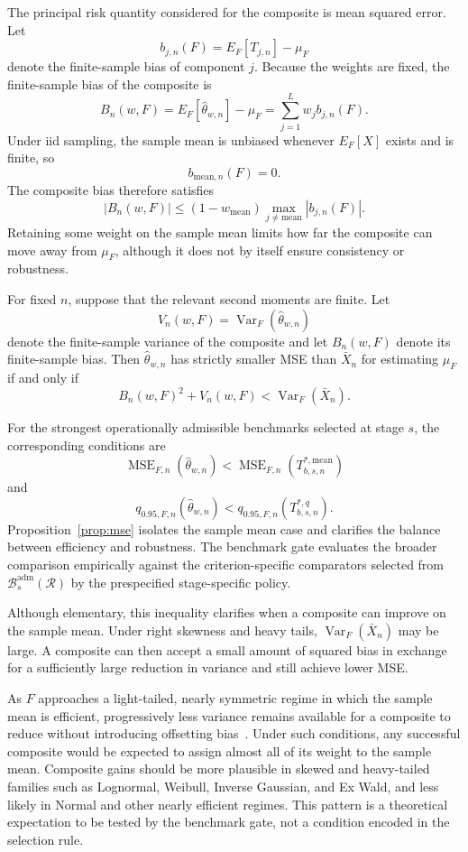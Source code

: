 The principal risk quantity considered for the composite is mean squared error. Let
\[
b_{j,n}(F)
=
E_F[T_{j,n}]-\mu_F
\]
denote the finite-sample bias of component $j$. Because the weights are fixed, the finite-sample bias of the composite is
\[
B_n(w,F)
=
E_F[\widehat{\theta}_{w,n}]-\mu_F
=
\sum_{j=1}^{L}w_jb_{j,n}(F).
\]
Under iid sampling, the sample mean is unbiased whenever $E_F[X]$ exists and is finite, so
\[
b_{\mathrm{mean},n}(F)=0.
\]
The composite bias therefore satisfies
\[
|B_n(w,F)|
\leq
(1-w_{\mathrm{mean}})
\max_{j\neq\mathrm{mean}}
|b_{j,n}(F)|.
\]
Retaining some weight on the sample mean limits how far the composite can move away from $\mu_F$, although it does not by itself ensure consistency or robustness.

\begin{proposition}\label{prop:mse}
For fixed $n$, suppose that the relevant second moments are finite. Let
\[
V_n(w,F)
=
\operatorname{Var}_F(\widehat{\theta}_{w,n})
\]
denote the finite-sample variance of the composite and let $B_n(w,F)$ denote its finite-sample bias. Then $\widehat{\theta}_{w,n}$ has strictly smaller MSE than $\bar X_n$ for estimating $\mu_F$ if and only if
\[
B_n(w,F)^2+V_n(w,F)
<
\operatorname{Var}_F(\bar X_n).
\]
\end{proposition}

For the strongest operationally admissible benchmarks selected at stage \(s\), the corresponding conditions are
\[
\operatorname{MSE}_{F,n}(\widehat{\theta}_{w,n})
<
\operatorname{MSE}_{F,n}
\left(T^{*,\mathrm{mean}}_{b,s,n}\right)
\]
and
\[
q_{0.95,F,n}(\widehat{\theta}_{w,n})
<
q_{0.95,F,n}
\left(T^{*,q}_{b,s,n}\right).
\]
Proposition~\ref{prop:mse} isolates the sample mean case and clarifies the balance between efficiency and robustness. The benchmark gate evaluates the broader comparison empirically against the criterion-specific comparators selected from $\mathcal{B}^{\mathrm{adm}}_s(\mathcal{R})$ by the prespecified stage-specific policy.

\noindent Although elementary, this inequality clarifies when a composite can improve on the sample mean. Under right skewness and heavy tails, $\operatorname{Var}_F(\bar X_n)$ may be large. A composite can then accept a small amount of squared bias in exchange for a sufficiently large reduction in variance and still achieve lower MSE.

As $F$ approaches a light-tailed, nearly symmetric regime in which the sample mean is efficient, progressively less variance remains available for a composite to reduce without introducing offsetting bias~\citep{lehmann1998point,vandervaart1998asymptotic}. Under such conditions, any successful composite would be expected to assign almost all of its weight to the sample mean. Composite gains should be more plausible in skewed and heavy-tailed families such as Lognormal, Weibull, Inverse Gaussian, and Ex Wald, and less likely in Normal and other nearly efficient regimes. This pattern is a theoretical expectation to be tested by the benchmark gate, not a condition encoded in the selection rule.

